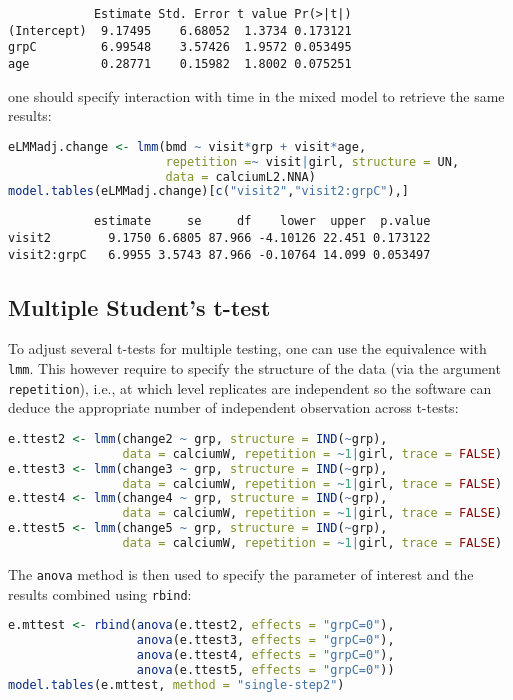 \documentclass[12pt]{article}
\begin{document}
\label{}
\begin{verbatim}
            Estimate Std. Error t value Pr(>|t|)
(Intercept)  9.17495    6.68052  1.3734 0.173121
grpC         6.99548    3.57426  1.9572 0.053495
age          0.28771    0.15982  1.8002 0.075251
\end{verbatim}


one should specify interaction with time in the mixed model to
retrieve the same results:
\begin{lstlisting}[language=r,numbers=none]
eLMMadj.change <- lmm(bmd ~ visit*grp + visit*age,
                      repetition =~ visit|girl, structure = UN,
                      data = calciumL2.NNA)
model.tables(eLMMadj.change)[c("visit2","visit2:grpC"),]
\end{lstlisting}

\label{}
\begin{verbatim}
            estimate     se     df    lower  upper  p.value
visit2        9.1750 6.6805 87.966 -4.10126 22.451 0.173122
visit2:grpC   6.9955 3.5743 87.966 -0.10764 14.099 0.053497
\end{verbatim}



\clearpage
\subsection{Multiple Student's t-test}
\label{sec:orga0b6149}

To adjust several t-tests for multiple testing, one can use the
equivalence with \texttt{lmm}. This however require to specify the structure
of the data (via the argument \texttt{repetition}), i.e., at which level
replicates are independent so the software can deduce the appropriate
number of independent observation across t-tests:

\begin{lstlisting}[language=r,numbers=none]
e.ttest2 <- lmm(change2 ~ grp, structure = IND(~grp), 
                data = calciumW, repetition = ~1|girl, trace = FALSE)
e.ttest3 <- lmm(change3 ~ grp, structure = IND(~grp), 
                data = calciumW, repetition = ~1|girl, trace = FALSE)
e.ttest4 <- lmm(change4 ~ grp, structure = IND(~grp), 
                data = calciumW, repetition = ~1|girl, trace = FALSE)
e.ttest5 <- lmm(change5 ~ grp, structure = IND(~grp), 
                data = calciumW, repetition = ~1|girl, trace = FALSE)
\end{lstlisting}

\noindent The \texttt{anova} method is then used to specify the parameter of
 interest and the results combined using \texttt{rbind}:
\begin{lstlisting}[language=r,numbers=none]
e.mttest <- rbind(anova(e.ttest2, effects = "grpC=0"),
                  anova(e.ttest3, effects = "grpC=0"),
                  anova(e.ttest4, effects = "grpC=0"),
                  anova(e.ttest5, effects = "grpC=0"))
model.tables(e.mttest, method = "single-step2")
\end{lstlisting}
\end{document}
